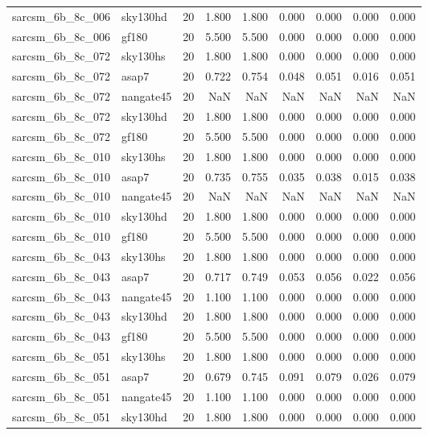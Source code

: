 \begin{tabular}{llrrrrrrr}
sarcsm\_6b\_8c\_006 & sky130hd & 20 & 1.800 & 1.800 & 0.000 & 0.000 & 0.000 & 0.000 \\
sarcsm\_6b\_8c\_006 & gf180 & 20 & 5.500 & 5.500 & 0.000 & 0.000 & 0.000 & 0.000 \\
sarcsm\_6b\_8c\_072 & sky130hs & 20 & 1.800 & 1.800 & 0.000 & 0.000 & 0.000 & 0.000 \\
sarcsm\_6b\_8c\_072 & asap7 & 20 & 0.722 & 0.754 & 0.048 & 0.051 & 0.016 & 0.051 \\
sarcsm\_6b\_8c\_072 & nangate45 & 20 & NaN & NaN & NaN & NaN & NaN & NaN \\
sarcsm\_6b\_8c\_072 & sky130hd & 20 & 1.800 & 1.800 & 0.000 & 0.000 & 0.000 & 0.000 \\
sarcsm\_6b\_8c\_072 & gf180 & 20 & 5.500 & 5.500 & 0.000 & 0.000 & 0.000 & 0.000 \\
sarcsm\_6b\_8c\_010 & sky130hs & 20 & 1.800 & 1.800 & 0.000 & 0.000 & 0.000 & 0.000 \\
sarcsm\_6b\_8c\_010 & asap7 & 20 & 0.735 & 0.755 & 0.035 & 0.038 & 0.015 & 0.038 \\
sarcsm\_6b\_8c\_010 & nangate45 & 20 & NaN & NaN & NaN & NaN & NaN & NaN \\
sarcsm\_6b\_8c\_010 & sky130hd & 20 & 1.800 & 1.800 & 0.000 & 0.000 & 0.000 & 0.000 \\
sarcsm\_6b\_8c\_010 & gf180 & 20 & 5.500 & 5.500 & 0.000 & 0.000 & 0.000 & 0.000 \\
sarcsm\_6b\_8c\_043 & sky130hs & 20 & 1.800 & 1.800 & 0.000 & 0.000 & 0.000 & 0.000 \\
sarcsm\_6b\_8c\_043 & asap7 & 20 & 0.717 & 0.749 & 0.053 & 0.056 & 0.022 & 0.056 \\
sarcsm\_6b\_8c\_043 & nangate45 & 20 & 1.100 & 1.100 & 0.000 & 0.000 & 0.000 & 0.000 \\
sarcsm\_6b\_8c\_043 & sky130hd & 20 & 1.800 & 1.800 & 0.000 & 0.000 & 0.000 & 0.000 \\
sarcsm\_6b\_8c\_043 & gf180 & 20 & 5.500 & 5.500 & 0.000 & 0.000 & 0.000 & 0.000 \\
sarcsm\_6b\_8c\_051 & sky130hs & 20 & 1.800 & 1.800 & 0.000 & 0.000 & 0.000 & 0.000 \\
sarcsm\_6b\_8c\_051 & asap7 & 20 & 0.679 & 0.745 & 0.091 & 0.079 & 0.026 & 0.079 \\
sarcsm\_6b\_8c\_051 & nangate45 & 20 & 1.100 & 1.100 & 0.000 & 0.000 & 0.000 & 0.000 \\
sarcsm\_6b\_8c\_051 & sky130hd & 20 & 1.800 & 1.800 & 0.000 & 0.000 & 0.000 & 0.000 \\

\end{tabular}
